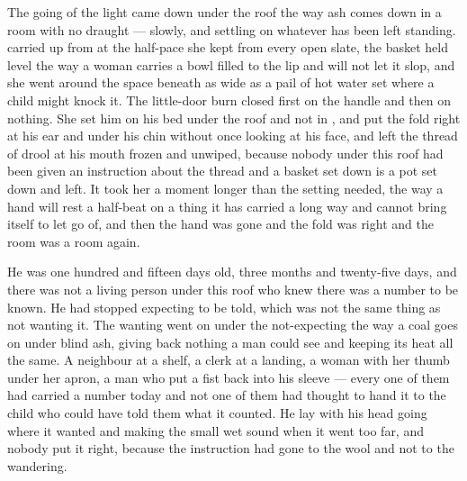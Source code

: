 The going of the light came down under the  roof the way ash comes down in a room with no draught --- slowly, and settling on whatever has been left standing.  carried  up from  at the half-pace she kept from every open slate, the basket held level the way a woman carries a bowl filled to the lip and will not let it slop, and she went around the space beneath  as wide as a pail of hot water set where a child might knock it. The little-door burn closed first on the handle and then on nothing. She set him on his bed under the roof and not in , and put the fold right at his ear and under his chin without once looking at his face, and left the thread of drool at his mouth frozen and unwiped, because nobody under this roof had been given an instruction about the thread and a basket set down is a pot set down and left. It took her a moment longer than the setting needed, the way a hand will rest a half-beat on a thing it has carried a long way and cannot bring itself to let go of, and then the hand was gone and the fold was right and the room was a room again.

He was one hundred and fifteen days old, three months and twenty-five days, and there was not a living person under this roof who knew there was a number to be known. He had stopped expecting to be told, which was not the same thing as not wanting it. The wanting went on under the not-expecting the way a coal goes on under blind ash, giving back nothing a man could see and keeping its heat all the same. A neighbour at a shelf, a clerk at a landing, a woman with her thumb under her apron, a man who put a fist back into his sleeve --- every one of them had carried a number today and not one of them had thought to hand it to the child who could have told them what it counted. He lay with his head going where it wanted and making the small wet sound when it went too far, and nobody put it right, because the instruction had gone to the wool and not to the wandering.

